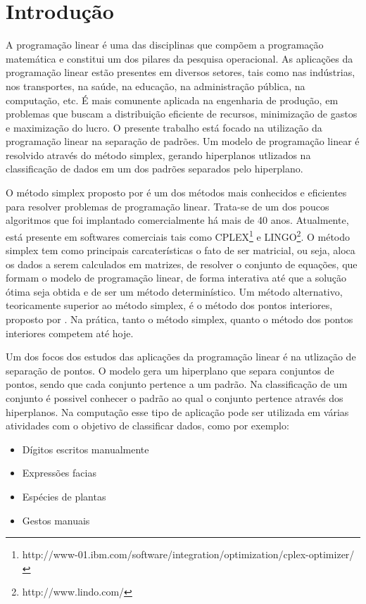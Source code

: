 \chapter{Introdução}

A programação linear é uma das disciplinas que compõem a programação matemática e constitui um dos pilares da pesquisa operacional. As aplicações da programação linear estão presentes em diversos setores, tais como nas indústrias, nos transportes, na saúde, na educação, na administração pública, na computação, etc. É mais comunente aplicada na engenharia de produção, em problemas que buscam a distribuição eficiente de recursos, minimização de gastos e maximização do lucro. O presente trabalho está focado na utilização da programação linear na separação de padrões. Um modelo de programação linear é resolvido através do método simplex, gerando hiperplanos utlizados na classificação de dados em um dos padrões separados pelo hiperplano.

O método simplex proposto por  é um dos métodos mais conhecidos e eficientes para resolver problemas de programação linear. Trata-se de um dos poucos algoritmos que foi implantado comercialmente há mais de 40 anos. Atualmente, está presente em softwares comerciais tais como CPLEX\footnote{http://www-01.ibm.com/software/integration/optimization/cplex-optimizer/} e LINGO\footnote{http://www.lindo.com/}. O método simplex tem como principais carcaterísticas o fato de ser matricial, ou seja, aloca os dados a serem calculados em matrizes, de resolver o conjunto de equações, que formam o modelo de programação linear, de forma interativa até que a solução ótima seja obtida e de ser um método determinístico. Um método alternativo, teoricamente superior ao método simplex, é o método dos pontos interiores, proposto por . Na prática, tanto o método simplex, quanto o método dos pontos interiores competem até hoje.  

Um dos focos dos estudos das aplicações da programação linear é na utlização de separação de pontos. O modelo gera um hiperplano que separa conjuntos de pontos, sendo que cada conjunto pertence a um padrão. Na classificação de um conjunto é possivel conhecer o padrão ao qual o conjunto pertence através dos hiperplanos. Na computação esse tipo de aplicação pode ser utilizada em várias atividades com o objetivo de classificar dados, como por exemplo:

\begin{itemize}
\item Dígitos escritos manualmente
\item Expressões facias
\item Espécies de plantas
\item Gestos manuais
\end{itemize}


